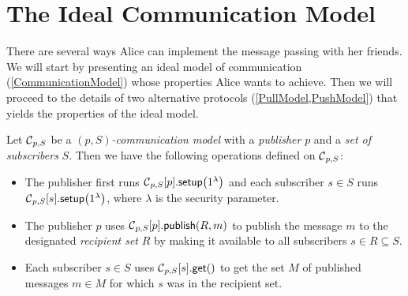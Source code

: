 %
%
\section{The Ideal Communication Model}\label{IdealCommunication}

There are several ways Alice can implement the message passing with her 
friends.
We will start by presenting an ideal model of communication 
(\cref{CommunicationModel}) whose properties Alice wants to achieve.
Then we will proceed to the details of two alternative protocols 
(\cref{PullModel,PushModel}) that yields the properties of the ideal model.

\begin{definition}\label{CommunicationModel}
  Let \(\C[p, S]\) be a \emph{\((p, S)\)-communication model} with 
  a \emph{publisher} \(p\) and a \emph{set of subscribers} \(S\).
  Then we have the following operations defined on \(\C[p, S]\):
  \begin{itemize}
    \item The publisher first runs \(\csetup[p, S]{p}[1^\lambda]\) and each 
      subscriber \(s\in S\) runs \(\csetup[p, S]{s}[1^\lambda]\), where 
      \(\lambda\) is the security parameter.
    \item The publisher \(p\) uses \(\cpub[p, S]{p}[R][m]\) to publish the 
      message \(m\) to the designated \emph{recipient set} \(R\) by making it 
      available to all subscribers \(s\in R\subseteq S\).
    \item Each subscriber \(s\in S\) uses \(\cget[p, S]{s}[]\) to get the set 
      \(M\) of published messages \(m\in M\) for which \(s\) was in the 
      recipient set.
  \end{itemize}
\end{definition}

